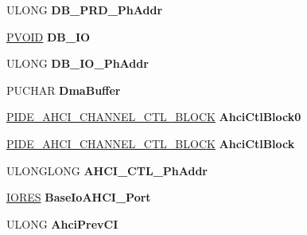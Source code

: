 \begin{DoxyCompactItemize}
U\+L\+O\+NG {\bfseries D\+B\+\_\+\+P\+R\+D\+\_\+\+Ph\+Addr}
\item 
\mbox{\label{struct___h_w___c_h_a_n_n_e_l_a105192dfa5f6f5766679a2f1f99004a1}} 
\hyperlink{interfacevoid}{P\+V\+O\+ID} {\bfseries D\+B\+\_\+\+IO}
\item 
\mbox{\label{struct___h_w___c_h_a_n_n_e_l_adf9fd832cd15c3f13f40153d1269b8d5}} 
U\+L\+O\+NG {\bfseries D\+B\+\_\+\+I\+O\+\_\+\+Ph\+Addr}
\item 
\mbox{\label{struct___h_w___c_h_a_n_n_e_l_af35e4c78df07fcf340f66857b8aeac21}} 
P\+U\+C\+H\+AR {\bfseries Dma\+Buffer}
\item 
\mbox{\label{struct___h_w___c_h_a_n_n_e_l_a8502a20195f898008c36236b80ba9b35}} 
\hyperlink{struct___i_d_e___a_h_c_i___c_h_a_n_n_e_l___c_t_l___b_l_o_c_k}{P\+I\+D\+E\+\_\+\+A\+H\+C\+I\+\_\+\+C\+H\+A\+N\+N\+E\+L\+\_\+\+C\+T\+L\+\_\+\+B\+L\+O\+CK} {\bfseries Ahci\+Ctl\+Block0}
\item 
\mbox{\label{struct___h_w___c_h_a_n_n_e_l_ad81b1566d60d8327a0a7c3087577b403}} 
\hyperlink{struct___i_d_e___a_h_c_i___c_h_a_n_n_e_l___c_t_l___b_l_o_c_k}{P\+I\+D\+E\+\_\+\+A\+H\+C\+I\+\_\+\+C\+H\+A\+N\+N\+E\+L\+\_\+\+C\+T\+L\+\_\+\+B\+L\+O\+CK} {\bfseries Ahci\+Ctl\+Block}
\item 
\mbox{\label{struct___h_w___c_h_a_n_n_e_l_ac15aa4d29b1105f66ba9d8f35de2147c}} 
U\+L\+O\+N\+G\+L\+O\+NG {\bfseries A\+H\+C\+I\+\_\+\+C\+T\+L\+\_\+\+Ph\+Addr}
\item 
\mbox{\label{struct___h_w___c_h_a_n_n_e_l_a3f0c2e8f736a23b3c998c3729220dbdb}} 
\hyperlink{struct___i_o_r_e_s}{I\+O\+R\+ES} {\bfseries Base\+Io\+A\+H\+C\+I\+\_\+\+Port}
\item 
\mbox{\label{struct___h_w___c_h_a_n_n_e_l_a2426a9dc58072a4755c206ca122ed0b4}} 
U\+L\+O\+NG {\bfseries Ahci\+Prev\+CI}
\item 
\mbox{\label{struct___h_w___c_h_a_n_n_e_l_ac8ed986e163e83a973f80e6643d5ee97}} 

\end{DoxyCompactItemize}
